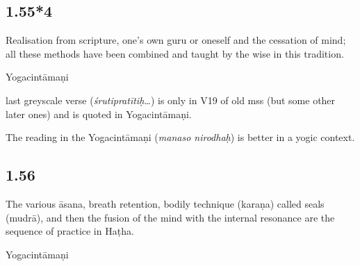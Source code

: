 \begin{ekdosis}
\subsection*{1.55*4}
\begin{translation}[hp01_055_4]
Realisation from scripture, one's own guru or oneself and the cessation of mind; all these methods have been combined and taught by the wise in this tradition.
\end{translation}

\begin{sources}[hp01_055_4]
\end{sources}

\begin{testimonia}[hp01_055_4]
Yogacintāmaṇi

\begin{versinnote}
\end{versinnote}

\end{testimonia}

\begin{philcomm}[hp01_055_4]
last greyscale verse (\emph{śrutipratītiḥ…}) is only in V19 of old mss (but some other later ones) and is quoted in Yogacintāmaṇi.

The reading in the Yogacintāmaṇi (\emph{manaso nirodhaḥ}) is better in a yogic context.
\end{philcomm}

\subsection*{1.56}
\begin{translation}[hp01_056]
The various āsana, breath retention, bodily technique (karaṇa) called seals (mudrā), and then the fusion of the mind with the internal resonance are the sequence of practice in Haṭha.
\end{translation}

\begin{sources}[hp01_056]
\end{sources}

\begin{testimonia}[hp01_056]
Yogacintāmaṇi

\begin{versinnote}
\end{versinnote}


\end{testimonia}
\end{ekdosis}
